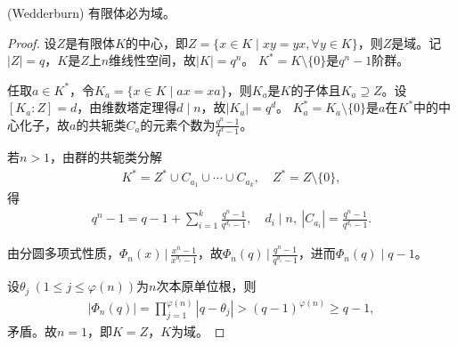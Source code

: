 \documentclass[../../main.tex]{subfiles}%
\begin{document}
\begin{theorem}
(Wedderburn) 有限体必为域。
\end{theorem}
\begin{proof}
设$Z$是有限体$K$的中心，即$Z=\{x\in K\mid xy=yx,\forall y\in K\}$，则$Z$是域。记$|Z|=q$，$K$是$Z$上$n$维线性空间，故$|K|=q^n$。
$K^*=K\setminus\{0\}$是$q^n-1$阶群。

任取$a\in K^*$，令$K_a=\{x\in K\mid ax=xa\}$，则$K_a$是$K$的子体且$K_a\supseteq Z$。设$[K_a:Z]=d$，由维数塔定理得$d\mid n$，故$|K_a|=q^d$。
$K_a^*=K_a\setminus\{0\}$是$a$在$K^*$中的中心化子，故$a$的共轭类$C_a$的元素个数为$\frac{q^n-1}{q^d-1}$。

若$n>1$，由群的共轭类分解
\begin{align*}
K^*=Z^*\cup C_{a_1}\cup\cdots\cup C_{a_k},\quad Z^*=Z\setminus\{0\},
\end{align*}
得
\begin{align*}
q^n-1=q-1+\sum\limits_{i=1}^{k}\frac{q^n-1}{q^{d_i}-1},\quad d_i\mid n,\ |C_{a_i}|=\frac{q^n-1}{q^{d_i}-1}.
\end{align*}

由分圆多项式性质，$\Phi_n(x)\,\bigg|\,\frac{x^n-1}{x^{d_i}-1}$，故$\Phi_n(q)\,\bigg|\,\frac{q^n-1}{q^{d_i}-1}$，进而$\Phi_n(q)\mid q-1$。

设$\theta_j\ (1\leqslant j\leqslant\varphi(n))$为$n$次本原单位根，则
\begin{align*}
|\Phi_n(q)|=\prod\limits_{j=1}^{\varphi(n)}|q-\theta_j|>(q-1)^{\varphi(n)}\geqslant q-1,
\end{align*}
矛盾。故$n=1$，即$K=Z$，$K$为域。
\end{proof}
\end{document}
